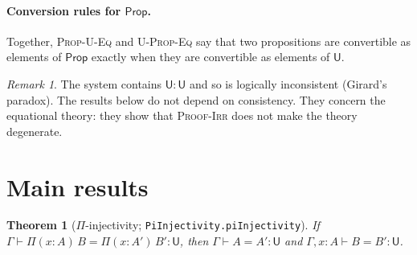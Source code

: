 \documentclass[11pt]{article}
\newcommand{\U}{\mathsf{U}}
\newcommand{\Prop}{\mathsf{Prop}}
\newcommand{\Pit}[2]{\Pi(#1)\,#2}
\newcommand{\ty}[3]{#1 \vdash #2 : #3}
\newcommand{\cv}[4]{#1 \vdash #2 = #3 : #4}
\newcommand{\agda}[1]{\texttt{#1}}
\theoremstyle{plain}
\newtheorem{theorem}{Theorem}
\theoremstyle{remark}
\newtheorem*{remark}{Remark}
\begin{document}
\paragraph{Conversion rules for $\Prop$.}

Together, \textsc{Prop-U-Eq} and \textsc{U-Prop-Eq} say that two
propositions are convertible as elements of $\Prop$ exactly when they are
convertible as elements of $\U$.

\begin{remark}
The system contains $\U : \U$ and so is logically inconsistent (Girard's
paradox). The results below do not depend on consistency. They concern the
equational theory: they show that \textsc{Proof-Irr} does not make the
theory degenerate.
\end{remark}

\section{Main results}

\begin{theorem}[$\Pi$-injectivity; \agda{PiInjectivity.piInjectivity}]
If $\cv{\Gamma}{\Pit{x:A}{B}}{\Pit{x:A'}{B'}}{\U}$, then
$\cv{\Gamma}{A}{A'}{\U}$ and $\cv{\Gamma, x{:}A}{B}{B'}{\U}$.
\end{theorem}
\end{document}
